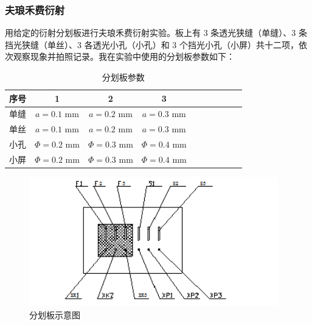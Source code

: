 \documentclass[UTF8]{article}
\theoremstyle{MyLineTheoremStyle} %
\theoremstyle{MyBlockTheoremStyle} %
\theoremstyle{MySubsubsectionStyle} %
\begin{document}
\subsubsection{夫琅禾费衍射}
用给定的衍射分划板进行夫琅禾费衍射实验。板上有 3 条透光狭缝（单缝）、3 条挡光狭缝（单丝）、3 各透光小孔（小孔）和 3 个挡光小孔（小屏）共十二项，依次观察现象并拍照记录。我在实验中使用的分划板参数如下：
\begin{center}
\noindent\begin{minipage}{0.49\columnwidth}
\begin{table}[H]\centering
    \caption{分划板参数}
    \label{分划板参数}
\begin{tabular}{cccccccccc}\toprule
    序号 & 1 & 2 & 3  \\
    \midrule
    单缝 & $a = 0.1$ mm &  $a = 0.2$ mm &  $a = 0.3$ mm   \\
    单丝 & $a = 0.1$ mm &  $a = 0.2$ mm &  $a = 0.3$ mm   \\
    小孔 & $\Phi = 0.2$ mm & $\Phi = 0.3$ mm & $\Phi = 0.4$ mm \\
    小屏 & $\Phi = 0.2$ mm & $\Phi = 0.3$ mm & $\Phi = 0.4$ mm \\
    \bottomrule
\end{tabular}
\end{table}
\end{minipage}\hfill\begin{minipage}{0.43\columnwidth}
\begin{figure}[H]\centering
    \includegraphics[width=0.95\columnwidth]{assets/4 衍射实验/分划板.png}
    \caption{分划板示意图}\label{分划板示意图}
\end{figure}
\end{minipage}\end{center}
\end{document}
